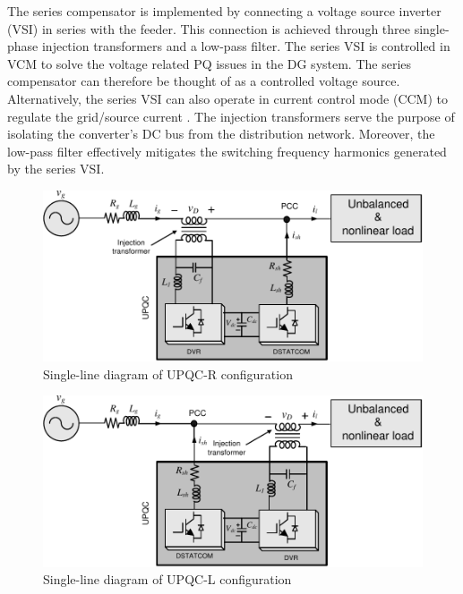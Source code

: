 The series compensator is implemented by connecting a voltage source inverter (VSI) in series with the feeder. This connection is achieved through three single-phase injection transformers and a low-pass filter. The series VSI is controlled in VCM to solve the voltage related PQ issues in the DG system. The series compensator can therefore be thought of as a controlled voltage source. Alternatively, the series VSI can also operate in current control mode (CCM) to regulate the grid/source current \cite{4762487,1256407,1046880}. The injection transformers serve the purpose of isolating the converter's DC bus from the distribution network. Moreover, the low-pass filter effectively mitigates the switching frequency harmonics generated by the series VSI.
\begin{figure}[ht]
	\centering
	\includegraphics[scale=0.88]{figures/Chapter_1_2/fig2p2}
	\caption{Single-line diagram of UPQC-R configuration}
	\label{fig2.2}
\end{figure}


\begin{figure}[ht]
	\centering
	\includegraphics[scale=0.88]{figures/Chapter_1_2/fig2p3}
	\caption{Single-line diagram of UPQC-L configuration}
	\label{fig2.3}
\end{figure}

